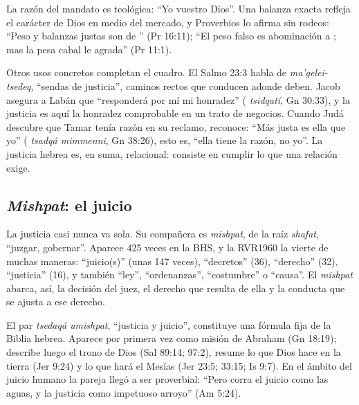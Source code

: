 La razón del mandato es teológica: ``Yo \SENOR{} vuestro Dios''. Una balanza exacta refleja el carácter de Dios en medio del mercado, y Proverbios lo afirma sin rodeos: ``Peso y balanzas justas son de \SENOR'' (Pr 16:11); ``El peso falso es abominación a \SENOR; mas la pesa cabal le agrada'' (Pr 11:1).

Otros usos concretos completan el cuadro. El Salmo 23:3 habla de  \emph{ma'gelei-tsedeq}, ``sendas de justicia'', caminos rectos que conducen adonde deben. Jacob asegura a Labán que ``responderá por mí mi honradez'' ( \emph{tsidqatí}, Gn 30:33), y la justicia es aquí la honradez comprobable en un trato de negocios. Cuando Judá descubre que Tamar tenía razón en su reclamo, reconoce: ``Más justa es ella que yo'' ( \emph{tsadqá mimmenni}, Gn 38:26), esto es, ``ella tiene la razón, no yo''. La justicia hebrea es, en suma, relacional: consiste en cumplir lo que una relación exige.


\subsection{\emph{Mishpat}: el juicio}
La justicia casi nunca va sola. Su compañera es  \emph{mishpat}, de la raíz  \emph{shafat}, ``juzgar, gobernar''. Aparece 425 veces en la BHS, y la RVR1960 la vierte de muchas maneras: ``juicio(s)'' (unas 147 veces), ``decretos'' (36), ``derecho'' (32), ``justicia'' (16), y también ``ley'', ``ordenanzas'', ``costumbre'' o ``causa''. El \emph{mishpat} abarca, así, la decisión del juez, el derecho que resulta de ella y la conducta que se ajusta a ese derecho.

El par  \emph{tsedaqá umishpat}, ``justicia y juicio'', constituye una fórmula fija de la Biblia hebrea. Aparece por primera vez como misión de Abraham (Gn 18:19); describe luego el trono de Dios (Sal 89:14; 97:2), resume lo que Dios hace en la tierra (Jer 9:24) y lo que hará el Mesías (Jer 23:5; 33:15; Is 9:7). En el ámbito del juicio humano la pareja llegó a ser proverbial: ``Pero corra el juicio como las aguas, y la justicia como impetuoso arroyo'' (Am 5:24).


